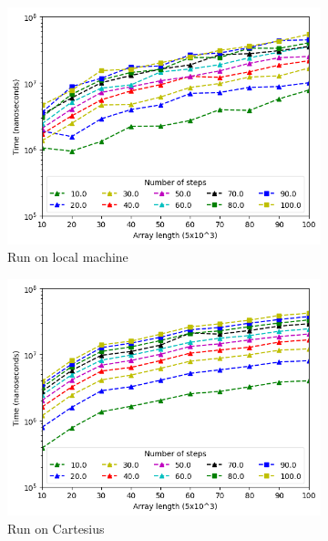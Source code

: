 \documentclass[a4paper]{article}
\begin{document}
\begin{figure}[htbp]
\centering
\begin{subfigure}{.45\textwidth}
  \centering
  \includegraphics[width=\linewidth]{res/seq/array_length_res_seq.png}
  \caption{Run on local machine}
  \label{subfig:length_seq}
\end{subfigure}%
\begin{subfigure}{.45\textwidth}
  \centering
  \includegraphics[width=\linewidth]{res/seq/array_length_res_seq_cartesius.png}
  \caption{Run on Cartesius}
  \label{subfig:length_seq_cart}
\end{subfigure}
\begin{subfigure}{.45\textwidth}
  \centering

\end{subfigure}
\end{figure}
\end{document}
